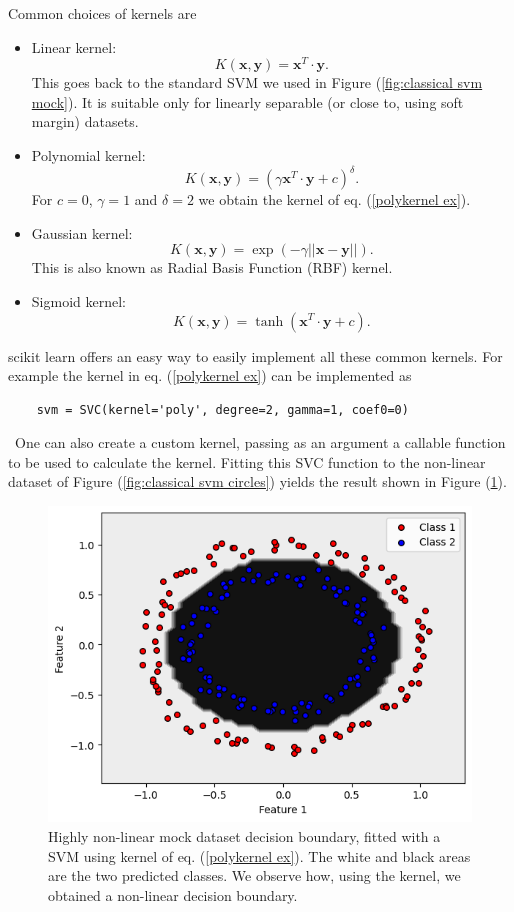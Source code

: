 \documentclass[a4paper]{article}
\begin{document}
Common choices of kernels are
\begin{itemize}
    \item Linear kernel: $$K(\mathbf{x},\mathbf{y})=\mathbf{x}^T\cdot\mathbf{y}.$$ This goes back to the standard SVM we used in Figure (\ref{fig:classical svm mock}). It is suitable only for linearly separable (or close to, using soft margin) datasets.
    \item Polynomial kernel: $$K(\mathbf{x},\mathbf{y})=(\gamma\mathbf{x}^T\cdot\mathbf{y}+c)^\delta.$$ For $c=0$, $\gamma=1$ and $\delta=2$ we obtain the kernel of eq. (\ref{polykernel ex}). 
    \item Gaussian kernel: $$K(\mathbf{x},\mathbf{y})=\exp(-\gamma||\mathbf{x}-\mathbf{y}||).$$ This is also known as Radial Basis Function (RBF) kernel. 
    \item Sigmoid kernel: $$K(\mathbf{x},\mathbf{y})=\tanh(\mathbf{x}^T\cdot\mathbf{y}+c).$$
\end{itemize}
scikit learn offers an easy way to easily implement all these common kernels. For example the kernel in eq. (\ref{polykernel ex}) can be implemented as 
\begin{lstlisting}
    svm = SVC(kernel='poly', degree=2, gamma=1, coef0=0)
\end{lstlisting}\
One can also create a custom kernel, passing as an argument a callable function to be used to calculate the kernel. Fitting this SVC function to the non-linear dataset of Figure (\ref{fig:classical svm circles}) yields the result shown in Figure (\ref{fig:classical svm circle decision boundary}). 
\begin{figure}[h!]
    \centering
    \includegraphics[width=\textwidth]{images/circlesclassicaldecisionboundary.png}
    \caption{Highly non-linear mock dataset decision boundary, fitted with a SVM using kernel of eq. (\ref{polykernel ex}). The white and black areas are the two predicted classes. We observe how, using the kernel, we obtained a non-linear decision boundary.}
    \label{fig:classical svm circle decision boundary}
\end{figure}
\newpage
\end{document}
